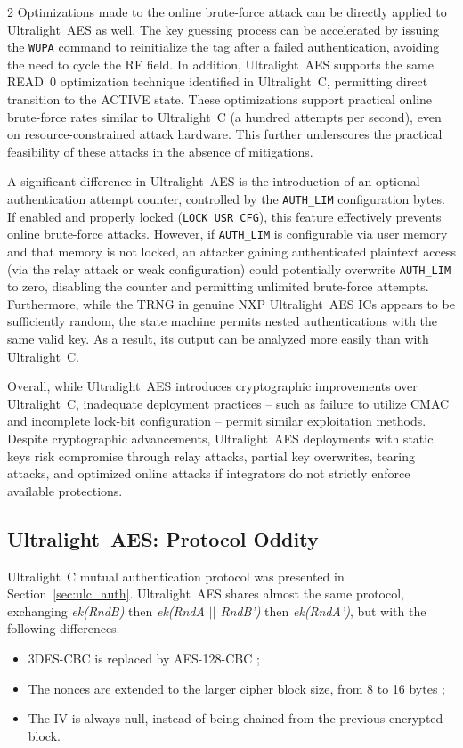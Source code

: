 \documentclass[10pt,letterpaper]{article}
\begin{document}
\begin{multicols}{2}
Optimizations made to the online brute-force attack can be directly applied to Ultralight~AES as well. The key guessing process can be accelerated by issuing the \texttt{WUPA} command to reinitialize the tag after a failed authentication, avoiding the need to cycle the RF field. In addition, Ultralight~AES supports the same READ~0 optimization technique identified in Ultralight~C, permitting direct transition to the ACTIVE state. These optimizations support practical online brute-force rates similar to Ultralight~C (a hundred attempts per second), even on resource-constrained attack hardware. This further underscores the practical feasibility of these attacks in the absence of mitigations.

A significant difference in Ultralight~AES is the introduction of an optional authentication attempt counter, controlled by the \texttt{AUTH\_LIM} configuration bytes. If enabled and properly locked (\texttt{LOCK\_USR\_CFG}), this feature effectively prevents online brute-force attacks. However, if \texttt{AUTH\_LIM} is configurable via user memory and that memory is not locked, an attacker gaining authenticated plaintext access (via the relay attack or weak configuration) could potentially overwrite \texttt{AUTH\_LIM} to zero, disabling the counter and permitting unlimited brute-force attempts. Furthermore, while the TRNG in genuine NXP Ultralight~AES ICs appears to be sufficiently random, the state machine permits nested authentications with the same valid key. As a result, its output can be analyzed more easily than with Ultralight~C.

Overall, while Ultralight~AES introduces cryptographic improvements over Ultralight~C, inadequate deployment practices -- such as failure to utilize CMAC and incomplete lock-bit configuration -- permit similar exploitation methods. Despite cryptographic advancements, Ultralight~AES deployments with static keys risk compromise through relay attacks, partial key overwrites, tearing attacks, and optimized online attacks if integrators do not strictly enforce available protections.

\subsection{Ultralight~AES: Protocol Oddity}
\label{sec:aes_oddity}
Ultralight~C mutual authentication protocol was presented in Section~\ref{sec:ulc_auth}.
Ultralight~AES shares almost the same protocol, exchanging \textit{ek(RndB)} then \textit{ek(RndA $||$ RndB')} then \textit{ek(RndA')}, but with the following differences.
\begin{itemize}
    \item 3DES-CBC is replaced by AES-128-CBC ;
    \item The nonces are extended to the larger cipher block size, from 8 to 16 bytes ;
    \item The IV is always null, instead of being chained from the previous encrypted block.
\end{itemize}


\end{multicols}
\end{document}

